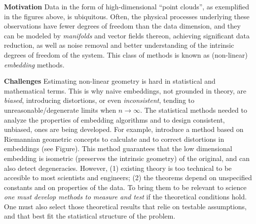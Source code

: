 \documentclass[floatfix,11pt]{article}
\begin{document}
\textbf{Motivation} Data in the form of
high-dimensional ``point clouds'',  as exemplified in the figures above, is ubiquitous.
%
Often, the physical processes underlying these observations have
fewer degrees of freedom than the data dimension, and they can be
modeled by {\em manifolds} and vector fields thereon, achieving
significant data reduction, as well as noise removal and better understanding of the intrinsic degrees of freedom of the system. This class
of methods is known as (non-linear) {\em  embedding} methods.



\textbf{Challenges} Estimating non-linear geometry is hard in statistical and mathematical terms. This is why na{i}ve embeddings, not grounded in theory, are {\em biased}, introducing distortions, or even {\em inconsistent}, tending to unreasonable/degenerate limits when $n\rightarrow \infty$. The statistical methods needed to analyze the properties of embedding algorithms and to design consistent, unbiased, ones are being developed. For example, \cite{2013arXiv1305.7255P} introduce a method based on Riemannian geometric concepts to calculate and to correct distortions in embeddings (see Figure). This method guarantees that the low dimensional embedding is isometric (preserves the intrinsic geometry) of the original, and can also detect degeneracies. 
However, (1) existing theory is too technical to be accesible to most scientists and engineers; (2) the theorems depend on unspecified constants and on properties of the data. To bring them to be relevant to science {\em one must develop methods to measure and test} if the theoretical conditions hold. One must also select those theoretical results that relie on testable assumptions, and that best fit the statistical structure of the problem. 
\end{document}
